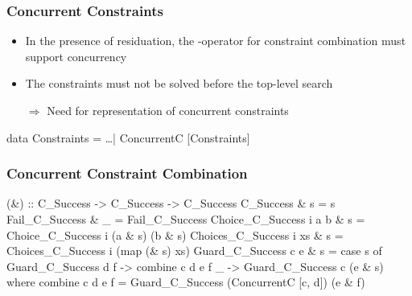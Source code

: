 \documentclass[
,hyperref={pdfpagelabels=false}
,xcolor=dvipsnames
]{beamer}
\newcommand{\ergo}{$\Rightarrow$}
\begin{document}
\begin{frame}[fragile]%
\frametitle{Concurrent Constraints}

\begin{itemize}
\item In the presence of residuation, the \code{(\&)}-operator
      for constraint combination must support concurrency
\item The constraints must not be solved before the top-level search
\item[\ergo] Need for representation of concurrent constraints
\end{itemize}


\begin{haskell}
data Constraints = \ldots \alert{| ConcurrentC [Constraints]}
\end{haskell}
\end{frame}

\begin{frame}[fragile]%
\frametitle{Concurrent Constraint Combination}

\begin{haskell}
(\&) :: C_Success -> C_Success -> C_Success
C_Success              \& s = s
Fail_C_Success         \& _ = Fail_C_Success
Choice_C_Success i a b \& s = Choice_C_Success i (a \& s) (b \& s)
Choices_C_Success i xs \& s = Choices_C_Success i (map (\& s) xs)
Guard_C_Success c e    \& s = case s of
  Guard_C_Success d f -> \alert{combine c d e f}
  _                   -> Guard_C_Success c (e \& s)
  where
  \alert{combine c d e f = Guard_C_Success (ConcurrentC [c, d]) (e \& f)}
\end{haskell}
\end{frame}
\end{document}
